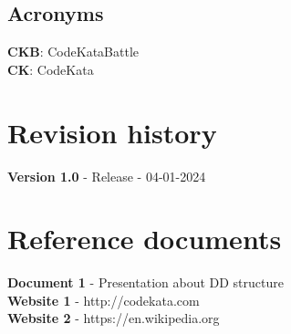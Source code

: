 \documentclass[12pt, a4paper]{report}
\begin{document}
    \subsection{Acronyms}
    \textbf{CKB}: CodeKataBattle \\
    \textbf{CK}: CodeKata
    
    \section{Revision history}
    \textbf{Version 1.0} - Release - 04-01-2024

    \section{Reference documents}
    \textbf{Document 1} - Presentation about DD structure\\
    \textbf{Website 1} - http://codekata.com \\
    \textbf{Website 2} - https://en.wikipedia.org
\end{document}
